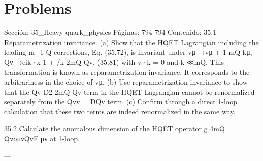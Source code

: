 \section*{Problems}
Sección: 35_Heavy-quark_physics
Páginas: 794-794
Contenido:
35.1 Reparametrization invariance.
(a) Show that the HQET Lagrangian including the leading m−1
Q
corrections, Eq.
(35.72), is invariant under
vμ →vμ +
1
mQ
kμ,
Qν →eik·x
1 +
/k
2mQ
Qv,
(35.81)
with v·k = 0 and k ≪mQ. This transformation is known as reparametrization
invariance. It corresponds to the arbitrariness in the choice of vμ.
(b) Use reparametrization invariance to show that the Qv
D2
2mQ Qv term in the HQET
Lagrangian cannot be renormalized separately from the Qvv · DQv term.
(c) Conﬁrm through a direct 1-loop calculation that these two terms are indeed
renormalized in the same way.

35.2 Calculate the anomalous dimension of the HQET operator
g
4mQ QvσμνQvF μν at
1-loop.


---

